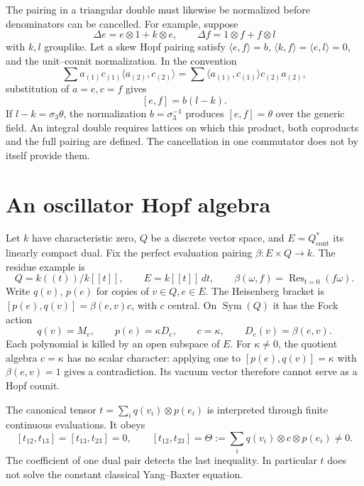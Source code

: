 The pairing in a triangular double must likewise be normalized
before denominators can be cancelled. For example, suppose
\[
 \Delta e=e\otimes1+k\otimes e,\qquad
 \Delta f=1\otimes f+f\otimes l
\]
with \(k,l\) grouplike. Let a skew Hopf pairing satisfy
\(\langle e,f\rangle=b\),
\(\langle k,f\rangle=\langle e,l\rangle=0\), and the
unit--counit normalization. In the convention
\[
 \sum a_{(1)}c_{(1)}\langle a_{(2)},c_{(2)}\rangle
 =\sum\langle a_{(1)},c_{(1)}\rangle c_{(2)}a_{(2)},
\]
substitution of \(a=e,c=f\) gives
\begin{equation}\label{cyrep:eq:paired-double}
 [e,f]=b(l-k).
\end{equation}
If \(l-k=\sigma_3\theta\), the normalization \(b=\sigma_3^{-1}\)
produces \([e,f]=\theta\) over the generic field.
An integral double requires lattices on which this product,
both coproducts and the full pairing are defined.
The cancellation in one commutator does not by itself provide them.

\section{An oscillator Hopf algebra}
\label{cyrep:sec:oscillator}

Let \(k\) have characteristic zero, \(Q\) be a discrete vector space,
and \(E=Q^*_{\mathrm{cont}}\) its linearly compact dual.
Fix the perfect evaluation pairing
\(\beta:E\times Q\to k\).
The residue example is
\[
 Q=k((t))/k[[t]],\qquad E=k[[t]]\,dt,\qquad
 \beta(\omega,f)=\operatorname{Res}_{t=0}(f\omega).
\]
Write \(q(v)\), \(p(e)\) for copies of \(v\in Q,e\in E\).
The Heisenberg bracket is
\([p(e),q(v)]=\beta(e,v)c\), with \(c\) central.
On \(\operatorname{Sym}(Q)\) it has the Fock action
\[
 q(v)=M_v,\qquad p(e)=\kappa D_e,\qquad c=\kappa,
 \qquad D_e(v)=\beta(e,v).
\]
Each polynomial is killed by an open subspace of \(E\).
For \(\kappa\ne0\), the quotient algebra \(c=\kappa\) has no
scalar character: applying one to \([p(e),q(v)]=\kappa\)
with \(\beta(e,v)=1\) gives a contradiction.
Its vacuum vector therefore cannot serve as a Hopf counit.

The canonical tensor \(t=\sum_iq(v_i)\otimes p(e_i)\)
is interpreted through finite continuous evaluations.
It obeys
\[
 [t_{12},t_{13}]=[t_{13},t_{23}]=0,\qquad
 [t_{12},t_{23}]=
 \Theta:=\sum_iq(v_i)\otimes c\otimes p(e_i)\ne0.
\]
The coefficient of one dual pair detects the last inequality.
In particular \(t\) does not solve the constant classical
Yang--Baxter equation.

